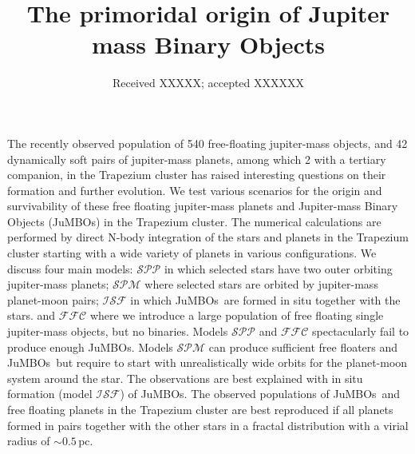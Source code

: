 \documentclass[aa]{lib/aa}
\newcommand{\jumbos}{\mbox{JuMBOs}}
\begin{document}
 

   \title{The primoridal origin of Jupiter mass Binary Objects}
   \date{Received XXXXX; accepted XXXXXX}

  \abstract
      {The recently observed population of 540
  free-floating jupiter-mass objects, and 42 dynamically soft pairs of
  jupiter-mass planets, among which 2 with a tertiary companion, in the Trapezium cluster has
  raised interesting questions on their formation and further
  evolution. }
   {We test various scenarios for the origin and survivability of
  these free floating jupiter-mass planets and Jupiter-mass Binary Objects
  (JuMBOs) in the Trapezium cluster.  }
   {The numerical calculations are performed by direct N-body
     integration of the stars and planets in the Trapezium cluster
     starting with a wide variety of planets in various
     configurations. We discuss four main models: $\mathcal{SPP}$ in
     which selected stars have two outer orbiting jupiter-mass
     planets; $\mathcal{SPM}$ where selected stars are orbited by 
     jupiter-mass planet-moon pairs; $\mathcal{ISF}$ in which
     \jumbos\, are formed in situ together with the stars. and
     $\mathcal{FFC}$ where we introduce a large population of free
     floating single jupiter-mass objects, but no binaries.  }
   {Models $\mathcal{SPP}$ and $\mathcal{FFC}$ spectacularly fail to
     produce enough \jumbos. Models $\mathcal{SPM}$ can produce
     sufficient free floaters and \jumbos\, but require to start with
     unrealistically wide orbits for the planet-moon system around the
     star.  The observations are best explained with in situ formation
     (model $\mathcal{ISF}$) of \jumbos.  }
   {The observed populations of \jumbos\, and free floating planets in
     the Trapezium cluster are best reproduced if all planets formed in
     pairs together with the other stars in a fractal distribution
     with a virial radius of $\sim 0.5$\,pc.  }
   
\end{document}
